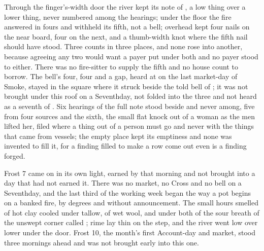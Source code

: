 Through the finger's-width door the river kept its note of , a low thing over a lower thing, never numbered among the hearings; under the floor the fire answered in fours and withheld its fifth, not a bell; overhead  kept four nails on the near board, four on the next, and a thumb-width knot where the fifth nail should have stood. Three counts in three places, and none rose into another, because agreeing any two would want a payer put under both and no payer stood to either. There was no fire-sitter to supply the fifth and no house count to borrow. The bell's four, four and a gap, heard at  on the last market-day of Smoke, stayed in the square where it struck beside the told bell of ; it was not brought under this roof on a Seventhday, not folded into the three and not heard as a seventh of . Six hearings of the full note stood beside and never among, five from four sources and the sixth, the small flat knock out of a woman as the men lifted her, filed where a thing out of a person must go and never with the things that came from vessels; the empty place kept its emptiness and none was invented to fill it, for a finding filled to make a row come out even is a finding forged.

\scenebreak

Frost 7 came on in its own light, earned by that morning and not brought into a day that had not earned it. There was no market, no Cross and no bell on a Seventhday, and the last third of the working week began the way a pot begins on a banked fire, by degrees and without announcement. The small hours smelled of hot clay cooled under tallow, of wet wool, and under both of the sour breath of the unswept corner called ; rime lay thin on the step, and the river went low over lower under the door. Frost 10, the month's first Account-day and market, stood three mornings ahead and was not brought early into this one.

